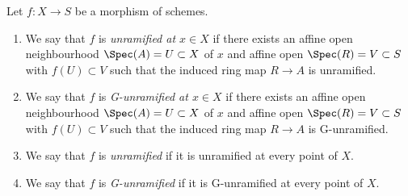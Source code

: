 \begin{definition}
\label{definition-unramified}
Let $f : X \to S$ be a morphism of schemes.
\begin{enumerate}
\item We say that $f$ is {\it unramified at $x \in X$} if
there exists an affine open neighbourhood $\Spec(A) = U \subset X$
of $x$ and affine open $\Spec(R) = V \subset S$
with $f(U) \subset V$ such that the induced ring map
$R \to A$ is unramified.
\item We say that $f$ is {\it G-unramified at $x \in X$} if
there exists an affine open neighbourhood $\Spec(A) = U \subset X$
of $x$ and affine open $\Spec(R) = V \subset S$
with $f(U) \subset V$ such that the induced ring map
$R \to A$ is G-unramified.
\item We say that $f$ is {\it unramified} if it is unramified
at every point of $X$.
\item We say that $f$ is {\it G-unramified} if it is G-unramified
at every point of $X$.
\end{enumerate}
\end{definition}